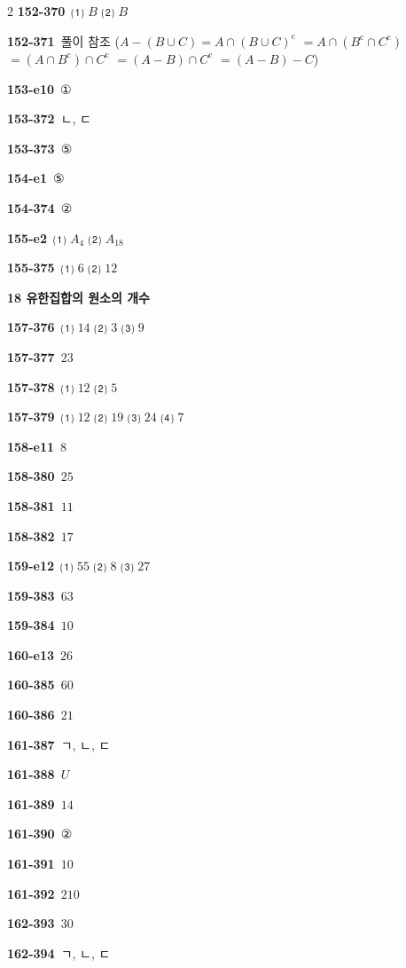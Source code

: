 \documentclass[10pt,a4paper]{article}
\newcommand{\comp}[1]{{#1}^{\mathrm{c}}}
\begin{document}
\begin{multicols}{2}
\noindent\textbf{152-370}\ ⑴ $B$ ⑵ $B$\par
\noindent\textbf{152-371}\ 풀이 참조 ($A-(B\cup C)=A\cap\comp{(B\cup C)}$ $=A\cap(\comp{B}\cap\comp{C})$ $=(A\cap\comp{B})\cap\comp{C}$ $=(A-B)\cap\comp{C}$ $=(A-B)-C$)\par
\noindent\textbf{153-e10}\ ①\par
\noindent\textbf{153-372}\ ㄴ, ㄷ\par
\noindent\textbf{153-373}\ ⑤\par
\noindent\textbf{154-e1}\ ⑤\par
\noindent\textbf{154-374}\ ②\par
\noindent\textbf{155-e2}\ ⑴ $A_4$ ⑵ $A_{18}$\par
\noindent\textbf{155-375}\ ⑴ $6$ ⑵ $12$\par
\noindent\textbf{18 유한집합의 원소의 개수}\par\smallskip
\noindent\textbf{157-376}\ ⑴ $14$ ⑵ $3$ ⑶ $9$\par
\noindent\textbf{157-377}\ $23$\par
\noindent\textbf{157-378}\ ⑴ $12$ ⑵ $5$\par
\noindent\textbf{157-379}\ ⑴ $12$ ⑵ $19$ ⑶ $24$ ⑷ $7$\par
\noindent\textbf{158-e11}\ $8$\par
\noindent\textbf{158-380}\ $25$\par
\noindent\textbf{158-381}\ $11$\par
\noindent\textbf{158-382}\ $17$\par
\noindent\textbf{159-e12}\ ⑴ $55$ ⑵ $8$ ⑶ $27$\par
\noindent\textbf{159-383}\ $63$\par
\noindent\textbf{159-384}\ $10$\par
\noindent\textbf{160-e13}\ $26$\par
\noindent\textbf{160-385}\ $60$\par
\noindent\textbf{160-386}\ $21$\par
\noindent\textbf{161-387}\ ㄱ, ㄴ, ㄷ\par
\noindent\textbf{161-388}\ $U$\par
\noindent\textbf{161-389}\ $14$\par
\noindent\textbf{161-390}\ ②\par
\noindent\textbf{161-391}\ $10$\par
\noindent\textbf{161-392}\ $210$\par
\noindent\textbf{162-393}\ $30$\par
\noindent\textbf{162-394}\ ㄱ, ㄴ, ㄷ\par

\end{multicols}
\end{document}
